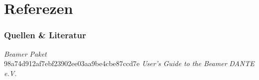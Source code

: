 \documentclass{beamer}
\begin{document}
\section[Quellen]{Referezen}

\begin{frame}\frametitle{Quellen \& Literatur}

\begin{thebibliography}{9}
 \emph{Beamer Paket} \\ 
98a74d912af7ebf23902ee03aa9be4cbe87ccd7e
 \emph{User's Guide to the Beamer} 
 \emph{DANTE e.V.}    
\end{thebibliography}


\end{frame}
\end{document}
